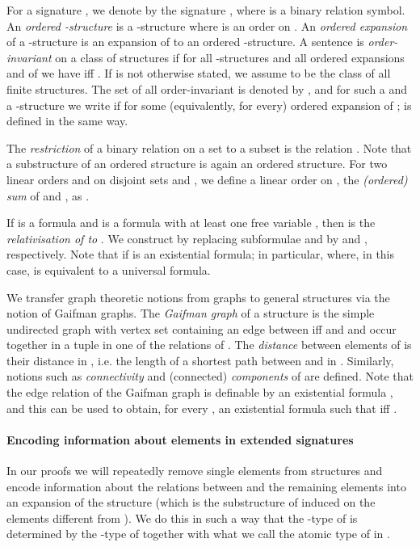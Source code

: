 \documentclass[11pt]{article}
\begin{document}
For a signature , we denote by  the signature , where  is a binary relation symbol. An
\emph{ordered -structure} is a -structure 
where  is an order on . An \emph{ordered expansion}
 of a -structure  is an expansion of  to an
ordered -structure. A sentence  is
\emph{order-invariant} on a class  of structures if for all
-structures  and all ordered expansions
 and  of  we have  iff .  If  is not
otherwise stated, we assume  to be the class of all finite
structures. The set of all order-invariant  is
denoted by , and for such a  and a -structure
 we write  if  for
some (equivalently, for every) ordered expansion  of ;
 is defined in the same way.

The \emph{restriction} of a binary relation  on a set  to a subset  is the relation . Note
that a substructure of an ordered structure is again an ordered structure.  For
two linear orders  and  on disjoint sets  and ,
we define a linear order  on , the
\emph{(ordered) sum} of  and , as .

If  is a formula and  is a formula with at least
one free variable , then  is the
\emph{relativisation of  to }. We construct  by
replacing subformulae  and  by  and , respectively. Note that  if  is an existential formula; in particular,  where, in this case,  is equivalent to
a universal formula.

We transfer graph theoretic notions from graphs to general structures via the
notion of Gaifman graphs. The \emph{Gaifman graph}  of a structure
 is the simple undirected graph with vertex set  containing an edge
between  iff  and  and  occur together in a tuple in
one of the relations of . The \emph{distance}  between
elements  of  is their distance in , i.e. the length of a
shortest path between  and  in .  Similarly, notions such as
\emph{connectivity} and (connected) \emph{components} of  are defined. Note
that the edge relation of the Gaifman graph is definable by an existential
formula , and this can be used to obtain, for every , an existential formula  such that  iff .

\paragraph{Encoding information about elements in extended
  signatures}

In our proofs we will repeatedly remove single elements  from
structures  and encode information about the relations between
 and the remaining elements into an expansion  of the
structure  (which is the substructure of 
induced on the elements different from ). We do this in such a way
that the -type of  is determined by the -type of
 together with what we call the atomic type of  in
.
\end{document}
